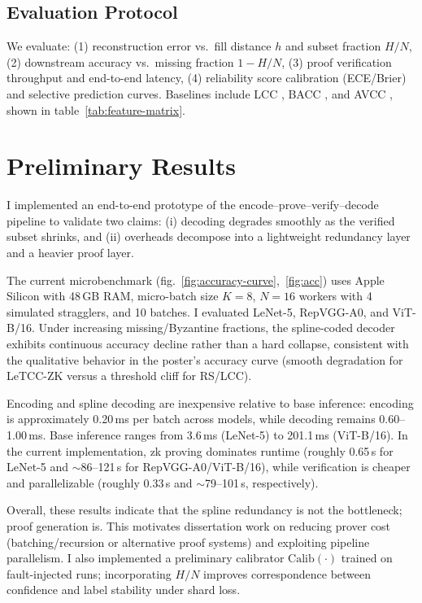 \documentclass[sigconf]{acmart}
\begin{document}
\subsection{Evaluation Protocol}
We evaluate:
(1) reconstruction error vs.\ fill distance $h$ and subset fraction $H/N$,
(2) downstream accuracy vs.\ missing fraction $1-H/N$,
(3) proof verification throughput and end-to-end latency,
(4) reliability score calibration (ECE/Brier) and selective prediction curves.
Baselines include LCC \cite{yu2019lagrange}, BACC \cite{jahani2020bacc}, and AVCC \cite{tang2021avcc}, shown in table~\ref{tab:feature-matrix}.




\section{Preliminary Results}
I implemented an end-to-end prototype of the encode--prove--verify--decode pipeline to validate two claims: (i) decoding degrades smoothly as the verified subset shrinks, and (ii) overheads decompose into a lightweight redundancy layer and a heavier proof layer.



The current microbenchmark (fig.~\ref{fig:accuracy-curve},~\ref{fig:acc}) uses Apple Silicon with 48\,GB RAM, micro-batch size $K{=}8$, $N{=}16$ workers with 4 simulated stragglers, and 10 batches. I evaluated LeNet-5, RepVGG-A0, and ViT-B/16. Under increasing missing/Byzantine fractions, the spline-coded decoder exhibits continuous accuracy decline rather than a hard collapse, consistent with the qualitative behavior in the poster’s accuracy curve (smooth degradation for LeTCC-ZK versus a threshold cliff for RS/LCC).

Encoding and spline decoding are inexpensive relative to base inference: encoding is approximately 0.20\,ms per batch across models, while decoding remains 0.60--1.00\,ms. Base inference ranges from 3.6\,ms (LeNet-5) to 201.1\,ms (ViT-B/16). In the current implementation, zk proving dominates runtime (roughly 0.65\,s for LeNet-5 and $\sim$86--121\,s for RepVGG-A0/ViT-B/16), while verification is cheaper and parallelizable (roughly 0.33\,s and $\sim$79--101\,s, respectively).

Overall, these results indicate that the spline redundancy is not the bottleneck; proof generation is. This motivates dissertation work on reducing prover cost (batching/recursion or alternative proof systems) and exploiting pipeline parallelism. I also implemented a preliminary calibrator $\mathrm{Calib}(\cdot)$ trained on fault-injected runs; incorporating $H/N$ improves correspondence between confidence and label stability under shard loss.
\end{document}
